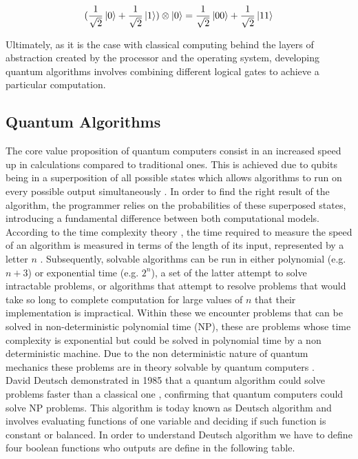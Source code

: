 \documentclass[12pt,a4paper]{scrartcl}
\newcommand{\tens}[1]{%
  \mathbin{\mathop{\otimes}\displaylimits_{#1}}%
}
\begin{document}
\begin{equation}
    (\frac{1}{\sqrt{2}}\ket{0} + \frac{1}{\sqrt{2}}\ket{1}) \tens{} \ket{0} =
    \frac{1}{\sqrt{2}}\ket{00} + \frac{1}{\sqrt{2}}\ket{11}
\end{equation}

Ultimately, as it is the case with classical computing behind the layers of abstraction created by the processor and the operating system, developing quantum algorithms involves combining different logical gates to achieve a particular computation. 

\subsection{Quantum Algorithms}\label{ss:quantumalgorithms}

The core value proposition of quantum computers consist in an increased speed up in calculations compared to traditional ones. This is achieved due to qubits being in a superposition of all possible states which allows algorithms to run on every possible output simultaneously \cite{bernhardt2019quantum}. In order to find the right result of the algorithm, the programmer relies on the probabilities of these superposed states, introducing a fundamental difference between both computational models.\\

According to the time complexity theory \cite{goodrich2001algorithm}, the time required to measure the speed of an algorithm is measured in terms of the length of its input, represented by a letter $n$ \cite{goodrich2001algorithm}. Subsequently, solvable algorithms can be run in either polynomial (e.g. $n+3$) or exponential time (e.g. $2^n$), a set of the latter attempt to solve intractable problems, or algorithms that attempt to resolve problems that would take so long to complete computation for large values of $n$ that their implementation is impractical. Within these we encounter problems that can be solved in non-deterministic polynomial time (NP), these are problems whose time complexity is exponential but could be solved in polynomial time by a non deterministic machine. Due to the non deterministic nature of quantum mechanics these problems are in theory solvable by quantum computers \cite{bernhardt2019quantum}.\\

David Deutsch demonstrated in 1985 that a quantum algorithm could solve problems faster than a classical one \cite{DeutschPenrose1985}, confirming that quantum computers could solve NP problems. This algorithm is today known as Deutsch algorithm and involves evaluating functions of one variable and deciding if such function is constant or balanced.
In order to understand Deutsch algorithm we have to define four boolean functions who outputs are define in the following table.
\end{document}
